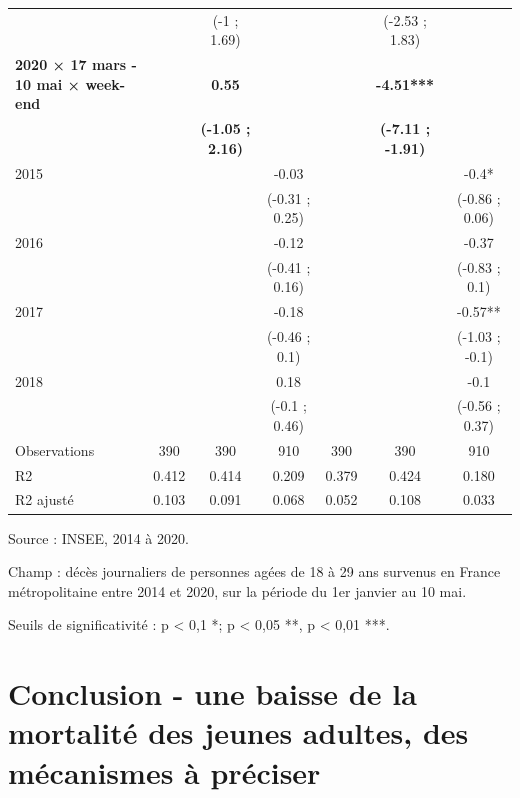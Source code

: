 \documentclass[titlepage]{article}
\begin{document}
\begin{landscape}
\begin{table}[H]
{\begin{threeparttable}
\begin{tabular}[t]{lcccccc}
 &  & (-1 ; 1.69) &  &  & (-2.53 ; 1.83) & \\
\textbf{2020 × 17 mars - 10 mai × week-end} & \textbf{} & \textbf{0.55} & \textbf{} & \textbf{} & \textbf{-4.51***} & \textbf{}\\
\textbf{} & \textbf{} & \textbf{(-1.05 ; 2.16)} & \textbf{} & \textbf{} & \textbf{(-7.11 ; -1.91)} & \textbf{}\\
2015 &  &  & -0.03 &  &  & -0.4*\\
 &  &  & (-0.31 ; 0.25) &  &  & (-0.86 ; 0.06)\\
2016 &  &  & -0.12 &  &  & -0.37\\
 &  &  & (-0.41 ; 0.16) &  &  & (-0.83 ; 0.1)\\
2017 &  &  & -0.18 &  &  & -0.57**\\
 &  &  & (-0.46 ; 0.1) &  &  & (-1.03 ; -0.1)\\
2018 &  &  & 0.18 &  &  & -0.1\\
 &  &  & (-0.1 ; 0.46) &  &  & (-0.56 ; 0.37)\\
Observations & 390 & 390 & 910 & 390 & 390 & 910\\
R2 & 0.412 & 0.414 & 0.209 & 0.379 & 0.424 & 0.180\\
R2 ajusté & 0.103 & 0.091 & 0.068 & 0.052 & 0.108 & 0.033\\
\bottomrule
\end{tabular}
\begin{tablenotes}
\item Source : INSEE, 2014 à 2020.
\item Champ : décès journaliers de personnes agées de 18 à 29 ans survenus en France métropolitaine entre 2014 et 2020, sur la période du 1er janvier au 10 mai.
\item Seuils de significativité : p < 0,1 *; p < 0,05 **, p < 0,01 ***.
\end{tablenotes}
\end{threeparttable}}
\end{table}
\end{landscape}

\section*{Conclusion - une baisse de la mortalité des jeunes adultes, des mécanismes à préciser}
\end{document}
